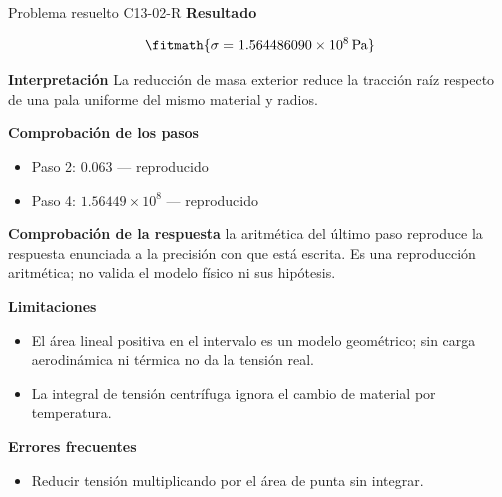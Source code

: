 \documentclass[10pt,openany]{book}
\begin{document}
\begin{studiumworked}{Problema resuelto C13-02-R}
\noindent\textbf{Resultado}

\[
\fitmath{\sigma=1.564486090\times10^{8}\,\mathrm{Pa}}
\]

\noindent\textbf{Interpretación}
La reducción de masa exterior reduce la tracción raíz respecto de una pala uniforme del mismo material y radios.

\noindent\textbf{Comprobación de los pasos}
\begin{itemize}
\item Paso 2: $0.063$ — reproducido
\item Paso 4: $1.56449\times 10^{8}$ — reproducido
\end{itemize}

\noindent\textbf{Comprobación de la respuesta} la aritmética del último paso reproduce la respuesta enunciada a la precisión con que está escrita. Es una reproducción aritmética; no valida el modelo físico ni sus hipótesis.

\noindent\textbf{Limitaciones}
\begin{itemize}
\item El área lineal positiva en el intervalo es un modelo geométrico; sin carga aerodinámica ni térmica no da la tensión real.
\item La integral de tensión centrífuga ignora el cambio de material por temperatura.
\end{itemize}

\noindent\textbf{Errores frecuentes}
\begin{itemize}
\item Reducir tensión multiplicando por el área de punta sin integrar.
\end{itemize}
\end{studiumworked}
\end{document}
